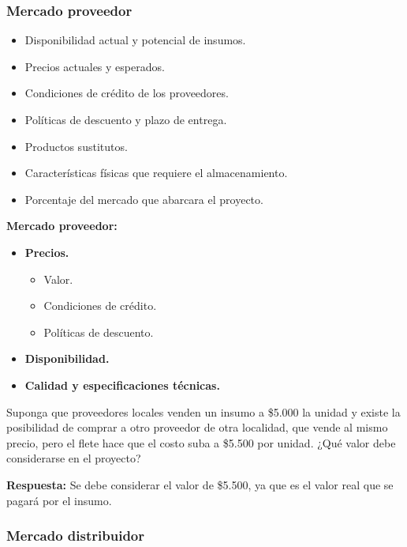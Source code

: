 \documentclass{templateNote}
\begin{document}
\subsubsection{Mercado proveedor}
\begin{itemize}
    \item Disponibilidad actual y potencial de insumos.
    \item Precios actuales y esperados.
    \item Condiciones de crédito de los proveedores.
    \item Políticas de descuento y plazo de entrega.
    \item Productos sustitutos.
    \item Características físicas que requiere el almacenamiento.
    \item Porcentaje del mercado que abarcara el proyecto.
\end{itemize}

\textbf{Mercado proveedor:}
\begin{itemize}
    \item \textbf{Precios.}
    \begin{itemize}
        \item Valor.
        \item Condiciones de crédito.
        \item Políticas de descuento.
    \end{itemize}
    \item \textbf{Disponibilidad.}
    \item \textbf{Calidad y especificaciones técnicas.}
\end{itemize}

\begin{tcolorbox}[colback=red!5!white,colframe=green!75!black]
    Suponga que proveedores locales venden un insumo a \$5.000 la unidad y existe la posibilidad de comprar a otro proveedor de otra localidad, que vende al mismo precio, pero el flete hace que el costo suba a \$5.500 por unidad. ¿Qué valor debe considerarse en el proyecto?

    \textbf{Respuesta:} Se debe considerar el valor de \$5.500, ya que es el valor real que se pagará por el insumo.
\end{tcolorbox}

\subsubsection{Mercado distribuidor}
\end{document}
